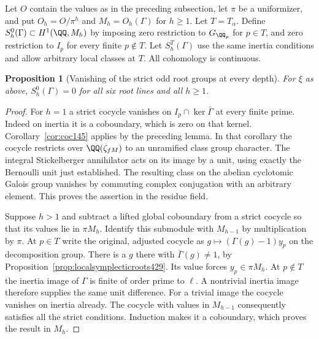 \documentclass[a4paper,11pt]{article}
\newtheorem{proposition}{Proposition}[section]
\theoremstyle{definition}
\theoremstyle{remark}
\numberwithin{equation}{section}
\begin{document}
Let \(O\) contain the values as in the preceding subsection, let
\(\pi\) be a uniformizer, and put \(O_h=O/\pi^h\) and
\(M_h=O_h(\Gamma)\) for \(h\ge1\). Let \(T=T_\alpha\).
Define \(S_h^0(\Gamma)\subset H^1(\QQ,M_h)\) by imposing zero
restriction to \(G_{\QQ_p}\) for \(p\in T\), and zero restriction
to \(I_p\) for every finite \(p\notin T\). Let \(S_h^T(\Gamma)\)
use the same inertia conditions and allow arbitrary local
classes at \(T\). All cohomology is continuous.

\begin{proposition}[Vanishing of the strict odd root groups at every depth]\leavevmode
\label{prop:oddstrictalllevels430}
For \(\xi\) as above, \(S_h^0(\Gamma)=0\) for all six root
lines and all \(h\ge1\).
\end{proposition}
\begin{proof}
For \(h=1\) a strict cocycle vanishes on
\(I_p\cap\ker\bar\Gamma\) at every finite prime. Indeed on
inertia it is a coboundary, which is zero on that kernel.
Corollary~\ref{cor:coc145} applies by the preceding lemma.
In that corollary the cocycle restricts over
\(\QQ(\zeta_{fM})\) to an unramified class group character.
The integral Stickelberger annihilator acts on its image by a
unit, using exactly the Bernoulli unit just established.
The resulting class on the abelian cyclotomic Galois group
vanishes by commuting complex conjugation with an arbitrary
element. This proves the assertion in the residue field.

Suppose \(h>1\) and subtract a lifted global coboundary from
a strict cocycle so that its values lie in \(\pi M_h\).
Identify this submodule with \(M_{h-1}\) by multiplication
by \(\pi\). At \(p\in T\) write the original, adjusted cocycle
as \(g\mapsto(\Gamma(g)-1)y_p\) on the decomposition group.
There is a \(g\) there with \(\bar\Gamma(g)\ne1\), by
Proposition~\ref{prop:localsymplecticroots429}. Its value
forces \(y_p\in\pi M_h\). At \(p\notin T\) the inertia image
of \(\Gamma\) is finite of order prime to \(\ell\). A nontrivial
inertia image therefore supplies the same unit difference.
For a trivial image the cocycle vanishes on inertia already.
The cocycle with values in \(M_{h-1}\) consequently satisfies
all the strict conditions. Induction makes it a coboundary,
which proves the result in \(M_h\).
\end{proof}
\end{document}

